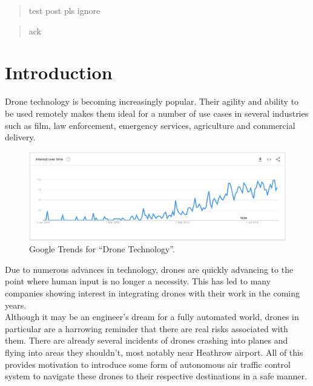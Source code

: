 \documentclass[a4paper,12pt,titlepage]{article}
\begin{document}
\renewcommand{\abstractname}{\large Abstract}
\begin{abstract}
test post pls ignore
\end{abstract}

\renewcommand{\abstractname}{\large Acknowledgements}
\begin{abstract}
ack
\end{abstract}

\newpage

\tableofcontents

\newpage

\section{Introduction}
Drone technology is becoming increasingly popular. Their agility and ability to be used remotely makes them ideal for a number of use cases in several industries such as film, law enforcement, emergency services, agriculture and commercial delivery\cite{Koontz}.

\begin{figure}[!hbpt]
  \center
  \includegraphics[width=\linewidth]{img/drone_interest_over_time_google.png}
  \caption{Google Trends for ``Drone Technology''. \cite{Google2018}}
  \label{fig:starship_citizen}
\end{figure}

Due to numerous advances in technology, drones are quickly advancing to the point where human input is no longer a necessity. This has led to many companies showing interest in integrating drones with their work in the coming years. \\

Although it may be an engineer's dream for a fully automated world, drones in particular are a harrowing reminder that there are real risks associated with them. There are already several incidents of drones crashing into planes and flying into areas they shouldn't, most notably near Heathrow airport\cite{BBCNews2017}. All of this provides motivation to introduce some form of autonomous air traffic control system to navigate these drones to their respective destinations in a safe manner.\\
\end{document}
